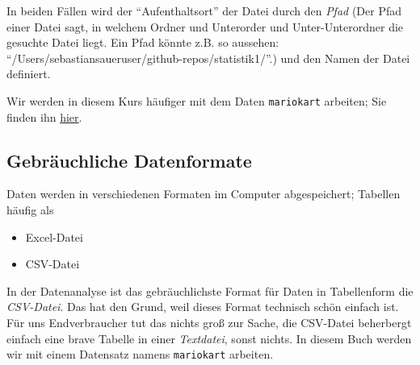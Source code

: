 \documentclass[
  letterpaper,
]{scrbook}
\providecommand{\tightlist}{%
  \setlength{\itemsep}{0pt}\setlength{\parskip}{0pt}}\usepackage{longtable,booktabs,array}
\theoremstyle{definition}
\theoremstyle{definition}
\theoremstyle{definition}
\theoremstyle{remark}
\begin{document}
In beiden Fällen wird der \enquote{Aufenthaltsort} der Datei durch den
\emph{Pfad} (Der Pfad einer Datei sagt, in welchem Ordner und Unterorder
und Unter-Unterordner die gesuchte Datei liegt. Ein Pfad könnte z.B. so
aussehen: \enquote{/Users/sebastiansaueruser/github-repos/statistik1/}.)
und den Namen der Datei definiert.

\begin{tcolorbox}[enhanced jigsaw, colbacktitle=quarto-callout-note-color!10!white, toptitle=1mm, colframe=quarto-callout-note-color-frame, breakable, toprule=.15mm, bottomrule=.15mm, bottomtitle=1mm, left=2mm, opacitybacktitle=0.6, colback=white, arc=.35mm, coltitle=black, title=\textcolor{quarto-callout-note-color}{\faInfo}\hspace{0.5em}{Hinweis}, opacityback=0, rightrule=.15mm, leftrule=.75mm, titlerule=0mm]

Wir werden in diesem Kurs häufiger mit dem Daten \texttt{mariokart}
arbeiten; Sie finden ihn
\href{https://vincentarelbundock.github.io/Rdatasets/csv/openintro/mariokart.csv}{hier}.\footnotemark{}

\end{tcolorbox}


\subsection{Gebräuchliche
Datenformate}\label{gebruxe4uchliche-datenformate}

Daten werden in verschiedenen Formaten im Computer abgespeichert;
Tabellen häufig als

\begin{itemize}
\tightlist
\item
  Excel-Datei
\item
  CSV-Datei
\end{itemize}

In der Datenanalyse ist das gebräuchlichste Format für Daten in
Tabellenform die \emph{CSV-Datei}. Das hat den Grund, weil dieses Format
technisch schön einfach ist. Für uns Endverbraucher tut das nichts groß
zur Sache, die CSV-Datei beherbergt einfach eine brave Tabelle in einer
\emph{Textdatei}, sonst nichts. In diesem Buch werden wir mit einem
Datensatz namens \texttt{mariokart} arbeiten.
\end{document}
